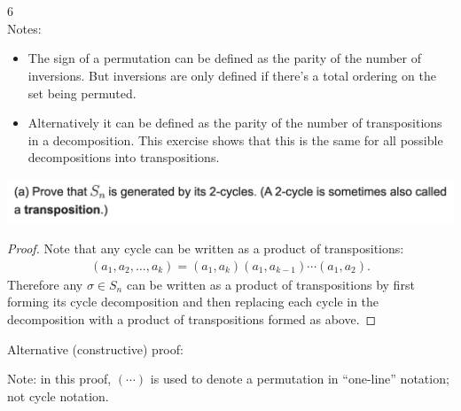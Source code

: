 ~\\~\\
6\\

Notes:

\begin{itemize}
\item The sign of a permutation can be defined as the parity of the number of inversions. But
  inversions are only defined if there's a total ordering on the set being permuted.
\item Alternatively it can be defined as the parity of the number of transpositions in a decomposition.
  This exercise shows that this is the same for all possible decompositions into transpositions.
\end{itemize}


\begin{mdframed}
\includegraphics[width=400pt]{img/algebra--nf--2-9aa2.png}
\end{mdframed}

\begin{proof}
  Note that any cycle can be written as a product of transpositions:
  \begin{align*}
     (a_1, a_2, \ldots, a_k) = (a_1, a_k)(a_1, a_{k-1}) \cdots (a_1, a_2).
  \end{align*}
  Therefore any $\sigma \in S_n$ can be written as a product of transpositions by first forming its cycle
  decomposition and then replacing each cycle in the decomposition with a product of transpositions
  formed as above.
\end{proof}


Alternative (constructive) proof:

Note: in this proof, $(\cdots)$ is used to denote a permutation in ``one-line​'' notation; not cycle notation.


